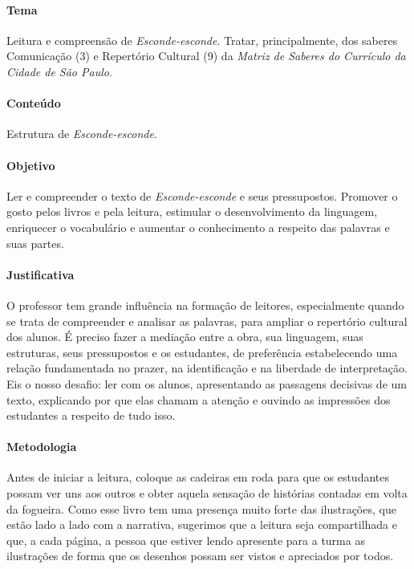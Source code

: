 \documentclass[11pt]{extarticle}
\begin{document}
\paragraph{Tema} Leitura e compreensão de \textit{Esconde-esconde}. Tratar, principalmente, dos saberes Comunicação (3) e Repertório Cultural (9) da \textit{Matriz de Saberes do Currículo da Cidade de São Paulo}.

\paragraph{Conteúdo} Estrutura de \textit{Esconde-esconde}.  

\paragraph{Objetivo} Ler e compreender o texto de \textit{Esconde-esconde} e seus pressupostos. Promover o gosto pelos livros e pela leitura, estimular o desenvolvimento da linguagem, enriquecer o vocabulário e aumentar o conhecimento a respeito das palavras e suas partes.   

\paragraph{Justificativa} O professor tem grande influência na formação de leitores, especialmente quando se trata de compreender e analisar as palavras, para ampliar o repertório cultural dos alunos. É preciso fazer a mediação entre a obra, sua linguagem, suas estruturas, seus pressupostos e os estudantes, de preferência estabelecendo uma relação fundamentada no prazer, na identificação e na liberdade de interpretação. Eis o nosso desafio: ler com os alunos, apresentando as passagens decisivas de um texto, explicando por que elas chamam a atenção e  ouvindo as impressões dos estudantes a respeito de tudo isso.  

\paragraph{Metodologia} Antes de iniciar a leitura, coloque as cadeiras em roda para que os estudantes possam ver uns aos outros e obter aquela sensação de histórias contadas em volta da fogueira. Como esse livro tem uma presença muito forte das ilustrações, que estão lado a lado com a narrativa, sugerimos que a leitura seja compartilhada e que, a cada página, a pessoa que estiver lendo apresente para a turma as ilustrações de forma que os desenhos possam ser vistos e apreciados por todos. 
\end{document}

